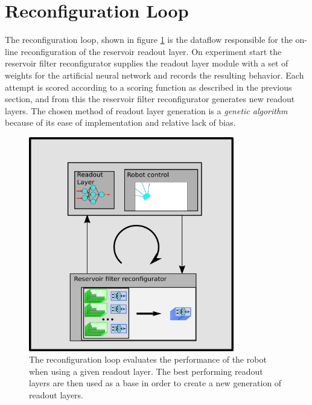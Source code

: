 \section{Reconfiguration Loop}
The reconfiguration loop, shown in figure \ref{figReconfLoop} is the dataflow
responsible for the on-line reconfiguration of the reservoir readout layer.
On experiment start the reservoir filter reconfigurator supplies the readout
layer module with a set of weights for the artificial neural network and records
the resulting behavior.
Each attempt is scored according to a scoring function as described in the
previous section, and from this the reservoir filter reconfigurator generates
new readout layers.
The chosen method of readout layer generation is a \emph{genetic algorithm}
because of its ease of implementation and relative lack of bias.
\begin{figure}[h!]
  \centering
  \includegraphics[width=0.8\textwidth]{fig/confLoop.png}
  \caption[Overview of reconfiguration loop]{
    The reconfiguration loop evaluates the performance of the robot when using a
    given readout layer.
    The best performing readout layers are then used as a base in order to
    create a new generation of readout layers.
  }
  \label{figReconfLoop}
\end{figure}
\cleardoublepage

